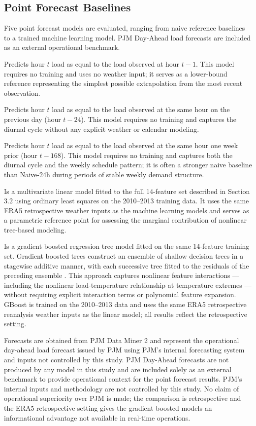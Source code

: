 \documentclass[12pt,a4paper]{article}
\begin{document}
\subsection{Point Forecast Baselines}
Five point forecast models are evaluated, ranging from naive reference baselines to a trained machine learning model. PJM Day-Ahead load forecasts are included as an external operational benchmark.
\begin{description}[leftmargin=!, labelwidth=3.4cm, itemsep=4pt]
\item[Persistence-1h] Predicts hour $t$ load as equal to the load observed at hour $t - 1$. This model requires no training and uses no weather input; it serves as a lower-bound reference representing the simplest possible extrapolation from the most recent observation.
\item[Naive-24h] Predicts hour $t$ load as equal to the load observed at the same hour on the previous day (hour $t - 24$). This model requires no training and captures the diurnal cycle without any explicit weather or calendar modeling.
\item[Naive-168h] Predicts hour $t$ load as equal to the load observed at the same hour one week prior (hour $t - 168$). This model requires no training and captures both the diurnal cycle and the weekly schedule pattern; it is often a stronger naive baseline than Naive-24h during periods of stable weekly demand structure.
\item[Linear Regression] Is a multivariate linear model fitted to the full 14-feature set described in Section 3.2 using ordinary least squares on the 2010–2013 training data. It uses the same ERA5 retrospective weather inputs as the machine learning models and serves as a parametric reference point for assessing the marginal contribution of nonlinear tree-based modeling.
\item[GBoost] Is a gradient boosted regression tree model fitted on the same 14-feature training set. Gradient boosted trees construct an ensemble of shallow decision trees in a stagewise additive manner, with each successive tree fitted to the residuals of the preceding ensemble \cite{friedman2001greedy}. This approach captures nonlinear feature interactions --- including the nonlinear load-temperature relationship at temperature extremes --- without requiring explicit interaction terms or polynomial feature expansion. GBoost is trained on the 2010–2013 data and uses the same ERA5 retrospective reanalysis weather inputs as the linear model; all results reflect the retrospective setting.
\item[PJM Day-Ahead] Forecasts are obtained from PJM Data Miner 2 and represent the operational day-ahead load forecast issued by PJM using PJM's internal forecasting system and inputs not controlled by this study. PJM Day-Ahead forecasts are not produced by any model in this study and are included solely as an external benchmark to provide operational context for the point forecast results. PJM's internal inputs and methodology are not controlled by this study. No claim of operational superiority over PJM is made; the comparison is retrospective and the ERA5 retrospective setting gives the gradient boosted models an informational advantage not available in real-time operations.
\end{description}
\end{document}
